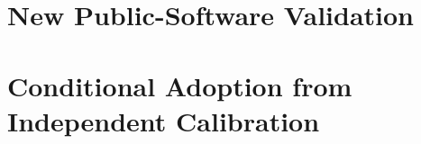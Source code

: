 \documentclass[11pt]{article}
\theoremstyle{definition}\newtheorem{definition}[theorem]{Definition}
\begin{document}
\section{New Public-Software Validation}\label{sec:v11evaluation}


\section{Conditional Adoption from Independent Calibration}






\appendix



\end{document}

